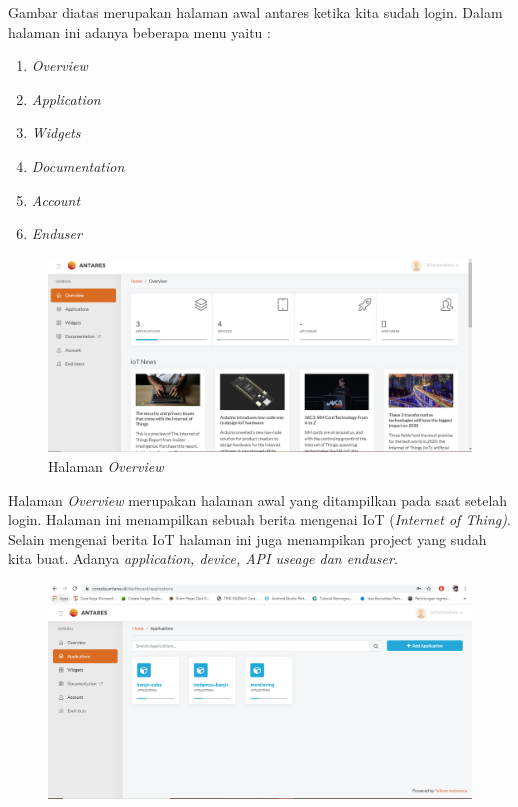\begin{enumerate}
    \par Gambar diatas merupakan halaman awal antares ketika kita sudah login. Dalam halaman ini adanya beberapa menu yaitu :
    \begin{enumerate}
        \item \textit{Overview}
        \item \textit{Application}
        \item \textit{Widgets}
        \item \textit{Documentation}
        \item \textit{Account}
        \item \textit{Enduser}
    \end{enumerate}
     \begin{figure}[H]
    \centering
    \includegraphics[width=1\textwidth]{figures/antares6.png}
    \caption{Halaman \textit{Overview}}
    \label{print}
    \end{figure}
    \par Halaman \textit{Overview} merupakan halaman awal yang ditampilkan pada saat setelah login. Halaman ini menampilkan sebuah berita mengenai IoT (\textit{Internet of Thing)}. Selain mengenai berita IoT halaman ini juga menampikan project yang sudah kita buat. Adanya \textit{application, device, API useage dan enduser.}
    \begin{figure}[H]
    \centering
    \includegraphics[width=1\textwidth]{figures/antares7.png}

\end{figure}
\end{enumerate}

